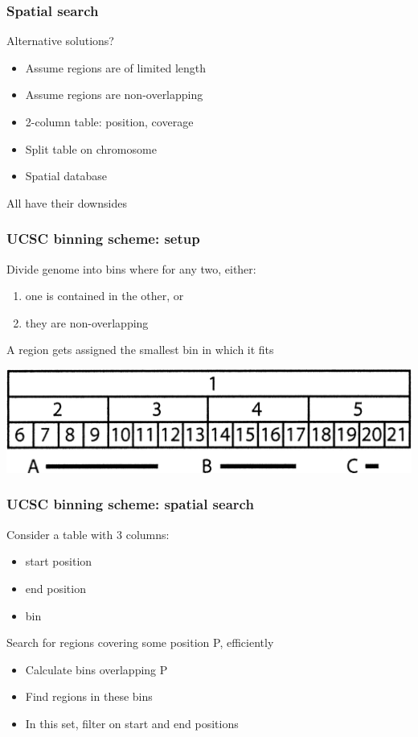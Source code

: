 \documentclass[slidestop]{beamer}
\begin{document}
\begin{frame}
  \frametitle{Spatial search}
  Alternative solutions?
  \begin{itemize}[<+->]
    \item Assume regions are of limited length
    \item Assume regions are non-overlapping
    \item 2-column table: position, coverage
    \item Split table on chromosome
    \item Spatial database
  \end{itemize}
  \vspace{1cm}
  \pause
  All have their downsides
\end{frame}

\begin{frame}
  \frametitle{UCSC binning scheme: setup}
  Divide genome into bins where for any two, either:
  \begin{enumerate}
    \item one is contained in the other, or
    \item they are non-overlapping
  \end{enumerate}
  \vspace{0.5cm}
  A region gets assigned the smallest bin in which it fits
  \vspace{0.5cm}
  \begin{center}
    \includegraphics[width=\textwidth]{binning}
  \end{center}
\end{frame}

\begin{frame}
  \frametitle{UCSC binning scheme: spatial search}
  Consider a table with 3 columns:
  \begin{itemize}
    \item start position
    \item end position
    \item bin
  \end{itemize}
  \vspace{0.5cm}
  \pause
  Search for regions covering some position P, efficiently
  \pause
  \begin{itemize}[<+->]
    \item Calculate bins overlapping P
    \item Find regions in these bins
    \item In this set, filter on start and end positions
  \end{itemize}
\end{frame}
\end{document}
